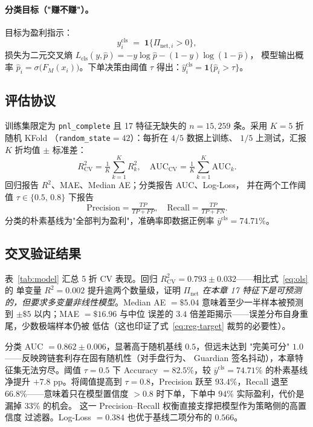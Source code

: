 \documentclass[sigconf,nonacm,10pt]{acmart}
\newcommand{\Pnet}{\Pi_{\text{net}}}
\begin{document}
\paragraph{分类目标（"赚不赚"）。}
目标为盈利指示：
\begin{equation}
y^{\text{cls}}_i \;=\; \mathbf{1}\{\Pi_{\text{net},i}>0\},
\label{eq:cls-target}
\end{equation}
损失为二元交叉熵
$L_{\text{cls}}(y,\hat p)=-y\log\hat p-(1-y)\log(1-\hat p)$，
模型输出概率 $\hat p_i=\sigma\!\bigl(F_M(x_i)\bigr)$。下单决策由阈值
$\tau$ 得出：$\hat y^{\text{cls}}_i = \mathbf{1}\{\hat p_i>\tau\}$。

\subsection{评估协议}

训练集限定为 \texttt{pnl\_complete} 且 17 特征无缺失的
$n=15{,}259$ 条。采用 $K=5$ 折随机 KFold
（\texttt{random\_state}$=42$）：每折在 $4/5$ 数据上训练、
$1/5$ 上测试，汇报 $K$ 折均值 $\pm$ 标准差：
\begin{equation}
R^2_{\text{CV}} = \tfrac{1}{K}\sum_{k=1}^{K} R^2_k,\quad
\text{AUC}_{\text{CV}} = \tfrac{1}{K}\sum_{k=1}^{K} \text{AUC}_k.
\label{eq:cv}
\end{equation}
回归报告 $R^2$、MAE、Median AE；分类报告 AUC、Log-Loss，
并在两个工作阈值 $\tau\in\{0.5,\, 0.8\}$ 下报告
\begin{equation}
\text{Precision}=\tfrac{TP}{TP+FP},\quad
\text{Recall}=\tfrac{TP}{TP+FN}.
\label{eq:pr}
\end{equation}
分类的朴素基线为"全部判为盈利"，准确率即数据正例率
$\bar y^{\text{cls}}=74.71\%$。

\subsection{交叉验证结果}

表~\ref{tab:model} 汇总 5 折 CV 表现。回归
$R^2_{\text{CV}}=0.793\pm0.032$——相比式~\eqref{eq:ols} 的
单变量 $R^2=0.002$ 提升逾两个数量级，证明 \emph{$\Pnet$ 在本章
17 特征下是可预测的，但要求多变量非线性模型}。Median AE $=\$5.04$
意味着至少一半样本被预测到 $\pm\$5$ 以内；MAE $=\$16.96$ 与中位
误差的 $3.4$ 倍差距揭示——误差分布自身重尾，少数极端样本仍被
低估（这也印证了式~\eqref{eq:reg-target} 裁剪的必要性）。

分类 AUC $=0.862\pm0.006$，显著高于随机基线 $0.5$，但远未达到
"完美可分" $1.0$——反映跨链套利存在固有随机性（对手盘行为、
Guardian 签名抖动），本章特征集无法穷尽。阈值 $\tau=0.5$ 下
Accuracy $=82.5\%$，较 $\bar y^{\text{cls}}=74.71\%$ 的朴素基线
净提升 $+7.8$ pp。将阈值提高到 $\tau=0.8$，Precision 跃至
$93.4\%$，Recall 退至 $66.8\%$——意味着只在模型置信度 $>0.8$
时下单，下单中 $94\%$ 实际盈利，代价是漏掉 $33\%$ 的机会。
这一 Precision--Recall 权衡直接支撑把模型作为策略侧的高置信度
过滤器。Log-Loss $=0.384$ 也优于基线二项分布的 $0.566$。
\end{document}
